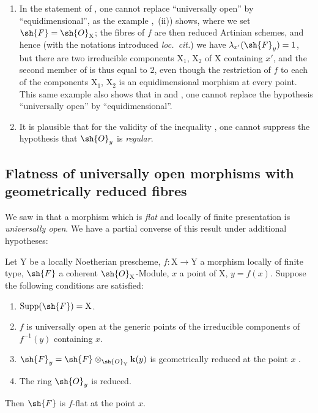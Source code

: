 \begin{remarks}[15.1.4]
\label{IV.15.1.4}
\begin{enumerate}[label=(\roman*)]
  \item In the statement of , one cannot replace ``universally open'' by ``equidimensional'', as the example ,~(ii)) shows, where we set $\sh{F}=\sh{O}_\mathrm{X}$; the fibres of $f$ are then reduced Artinian schemes, and hence (with the notations introduced \emph{loc.\ cit.}) we have $\lambda_{x'}(\sh{F}_y)=1$, but there are two irreducible components $\mathrm{X}_1$, $\mathrm{X}_2$ of $\mathrm{X}$ containing $x'$, and the second member of  is thus equal to $2$, even though the restriction of $f$ to each of the components $\mathrm{X}_1$, $\mathrm{X}_2$ is an equidimensional morphism at every point.
This same example also shows that in  and , one cannot replace the hypothesis ``universally open'' by ``equidimensional''.
  \item It is plausible that for the validity of the inequality , one cannot suppress the hypothesis that $\sh{O}_y$ is \emph{regular}.
\end{enumerate}
\end{remarks}

\subsection{Flatness of universally open morphisms with geometrically reduced fibres}
\label{subsection:IV.15.2}

\begin{env}[15.2.1]
\label{IV.15.2.1}
We saw in  that a morphism which is \emph{flat} and locally of finite presentation is \emph{universally open}.
We have a partial converse of this result under additional hypotheses:
\end{env}

\begin{theorem}[15.2.2]
\label{IV.15.2.2}
Let $\mathrm{Y}$ be a locally Noetherian prescheme, $f:\mathrm{X}\to\mathrm{Y}$ a morphism locally of finite type, $\sh{F}$ a coherent $\sh{O}_\mathrm{X}$-Module, $x$ a point of $\mathrm{X}$, $y=f(x)$.
Suppose the following conditions are satisfied:
\begin{enumerate}[label=(\roman*)]
  \item $\operatorname{Supp}(\sh{F})=\mathrm{X}$.
  \item $f$ is universally open at the generic points of the irreducible components of $f^{-1}(y)$ containing $x$.
  \item $\sh{F}_y=\sh{F}\otimes_{\sh{O}_\mathrm{Y}}\mathbf{k}(y)$ is geometrically reduced at the point $x$ .
  \item The ring $\sh{O}_y$ is reduced.
\end{enumerate}
Then $\sh{F}$ is $f$-flat at the point $x$.
\end{theorem}

